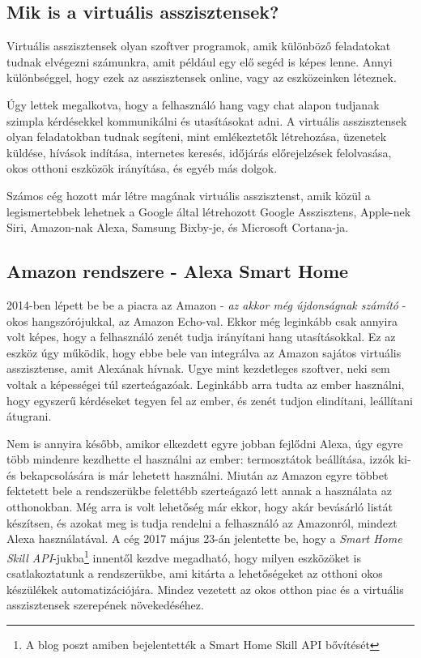 \documentclass[
]{thesis-ekf}
\theoremstyle{definition}
\theoremstyle{remark}
\begin{document}
	\subsection{Mik is a virtuális asszisztensek?}
	Virtuális asszisztensek olyan szoftver programok, amik különböző feladatokat tudnak elvégezni számunkra, amit például egy elő segéd is képes lenne. Annyi különbséggel, hogy ezek az asszisztensek online, vagy az eszközeinken léteznek. 
	
	Úgy lettek megalkotva, hogy a felhasználó hang vagy chat alapon tudjanak szimpla kérdésekkel kommunikálni és utasításokat adni. A virtuális asszisztensek olyan feladatokban tudnak segíteni, mint emlékeztetők létrehozása, üzenetek küldése, hívások indítása, internetes keresés, időjárás előrejelzések felolvasása, okos otthoni eszközök irányítása, és egyéb más dolgok. 
	
	Számos cég hozott már létre magának virtuális asszisztenst, amik közül a legismertebbek lehetnek a Google által létrehozott Google Asszisztens, Apple-nek Siri, Amazon-nak Alexa, Samsung Bixby-je, és Microsoft Cortana-ja.
	
	\subsection{Amazon rendszere - Alexa Smart Home}
	2014-ben lépett be be a piacra az Amazon - \emph{az akkor még újdonságnak számító} - okos hangszórójukkal, az Amazon Echo-val. Ekkor még leginkább csak annyira volt képes, hogy a felhasználó zenét tudja irányítani hang utasításokkal. Ez az eszköz úgy működik, hogy ebbe bele van integrálva az Amazon sajátos virtuális asszisztense, amit Alexának hívnak. Ugye mint kezdetleges szoftver, neki sem voltak a képességei túl szerteágazóak. Leginkább arra tudta az ember használni, hogy egyszerű kérdéseket tegyen fel az ember, és zenét tudjon elindítani, leállítani átugrani.
	
	Nem is annyira később, amikor elkezdett egyre jobban fejlődni Alexa, úgy egyre több mindenre kezdhette el használni az ember: termosztátok beállítása, izzók ki- és bekapcsolására is már lehetett használni. Miután az Amazon egyre többet fektetett bele a rendszerükbe felettébb szerteágazó lett annak a használata az otthonokban. Még arra is volt lehetőség már ekkor, hogy akár bevásárló listát készítsen, és azokat meg is tudja rendelni a felhasználó az Amazonról, mindezt Alexa használatával. A cég 2017 május 23-án jelentette be, hogy a \emph{Smart Home Skill API}-jukba\footnote{A blog poszt amiben bejelentették a Smart Home Skill API bővítését\cite{amazon-api}} innentől kezdve megadható, hogy milyen eszközöket is csatlakoztatunk a rendszerükbe, ami kitárta a lehetőségeket az otthoni okos készülékek automatizációjára. Mindez vezetett az okos otthon piac és a virtuális asszisztensek szerepének növekedéséhez.
	
\end{document}
